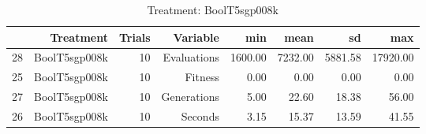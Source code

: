 \begin{table}[ht]
\centering
\begin{tabular}{rrrrrrrr}
  \hline
 & Treatment & Trials & Variable & min & mean & sd & max \\ 
  \hline
28 & BoolT5sgp008k &  10 & Evaluations & 1600.00 & 7232.00 & 5881.58 & 17920.00 \\ 
  25 & BoolT5sgp008k &  10 & Fitness & 0.00 & 0.00 & 0.00 & 0.00 \\ 
  27 & BoolT5sgp008k &  10 & Generations & 5.00 & 22.60 & 18.38 & 56.00 \\ 
  26 & BoolT5sgp008k &  10 & Seconds & 3.15 & 15.37 & 13.59 & 41.55 \\ 
   \hline
\end{tabular}
\caption{Treatment: BoolT5sgp008k} 
\end{table}
